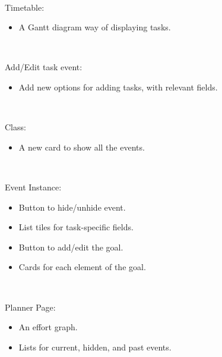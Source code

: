 ~

Timetable: 
\begin{itemize}
            \setlength{\topsep}{0.5pt}
            \setlength{\itemsep}{0.5pt}
            \setlength{\parsep}{0.5pt}
            \item A Gantt diagram \cite{wilson2003gantt} way of displaying tasks.
\end{itemize}

~

Add/Edit task event: 
\begin{itemize}
            \setlength{\topsep}{0.5pt}
            \setlength{\itemsep}{0.5pt}
            \setlength{\parsep}{0.5pt}
            \item Add new options for adding tasks, with relevant fields.
\end{itemize}

~

Class: 
\begin{itemize}
            \setlength{\topsep}{0.5pt}
            \setlength{\itemsep}{0.5pt}
            \setlength{\parsep}{0.5pt}
            \item A new card to show all the events.
\end{itemize}

~

Event Instance: 
\begin{itemize}
            \setlength{\topsep}{0.5pt}
            \setlength{\itemsep}{0.5pt}
            \setlength{\parsep}{0.5pt}
            \item Button to hide/unhide event.
            \item List tiles for task-specific fields.
            \item Button to add/edit the goal.
            \item Cards for each element of the goal.
\end{itemize}

~

Planner Page: 
\begin{itemize}
            \setlength{\topsep}{0.5pt}
            \setlength{\itemsep}{0.5pt}
            \setlength{\parsep}{0.5pt}
            \item An effort graph.
            \item Lists for current, hidden, and past events.
            
\end{itemize}

\clearpage

